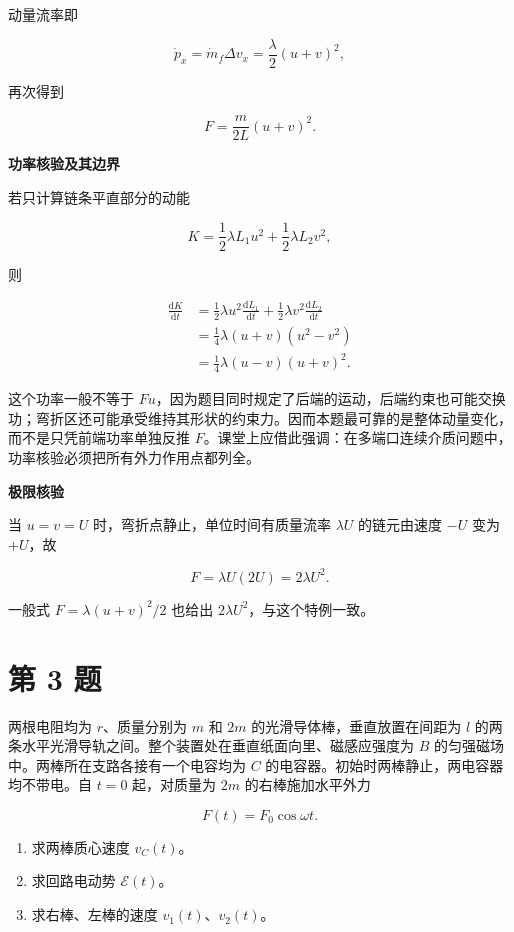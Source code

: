 \documentclass[12pt,a4paper,UTF8]{ctexart}
\newcommand{\tightlist}{\setlength{\itemsep}{0pt}\setlength{\parskip}{0pt}}
\begin{document}
动量流率即

\[
\dot p_x=\dot m_f\Delta v_x
=\frac{\lambda}{2}(u+v)^2,
\]

再次得到

\[F=\frac{m}{2L}(u+v)^2.\]

\textbf{功率核验及其边界}

若只计算链条平直部分的动能

\[K=\frac12\lambda L_1u^2+\frac12\lambda L_2v^2,\]

则

\[
\begin{aligned}
\frac{\mathrm{d}K}{\mathrm{d}t}
&=\frac12\lambda u^2\frac{\mathrm{d}L_1}{\mathrm{d}t}
+\frac12\lambda v^2\frac{\mathrm{d}L_2}{\mathrm{d}t}\\
&=\frac14\lambda(u+v)(u^2-v^2)\\
&=\frac14\lambda(u-v)(u+v)^2.
\end{aligned}
\]

这个功率一般不等于
\(Fu\)，因为题目同时规定了后端的运动，后端约束也可能交换功；弯折区还可能承受维持其形状的约束力。因而本题最可靠的是整体动量变化，而不是只凭前端功率单独反推
\(F\)。课堂上应借此强调：在多端口连续介质问题中，功率核验必须把所有外力作用点都列全。

\textbf{极限核验}

当 \(u=v=U\) 时，弯折点静止，单位时间有质量流率 \(\lambda U\)
的链元由速度 \(-U\) 变为 \(+U\)，故

\[F=\lambda U(2U)=2\lambda U^2.\]

一般式 \(F=\lambda(u+v)^2/2\) 也给出 \(2\lambda U^2\)，与这个特例一致。

\newpage

\section{第 3 题}\label{ux7b2c-3-ux9898}

两根电阻均为 \(r\)、质量分别为 \(m\) 和 \(2m\)
的光滑导体棒，垂直放置在间距为 \(l\)
的两条水平光滑导轨之间。整个装置处在垂直纸面向里、磁感应强度为 \(B\)
的匀强磁场中。两棒所在支路各接有一个电容均为 \(C\)
的电容器。初始时两棒静止，两电容器均不带电。自 \(t=0\) 起，对质量为
\(2m\) 的右棒施加水平外力

\[F(t)=F_0\cos\omega t.\]

\begin{enumerate}
\def\labelenumi{\arabic{enumi}.}
\tightlist
\item
  求两棒质心速度 \(v_C(t)\)。
\item
  求回路电动势 \(\mathcal E(t)\)。
\item
  求右棒、左棒的速度 \(v_1(t)\)、\(v_2(t)\)。
\end{enumerate}
\end{document}
